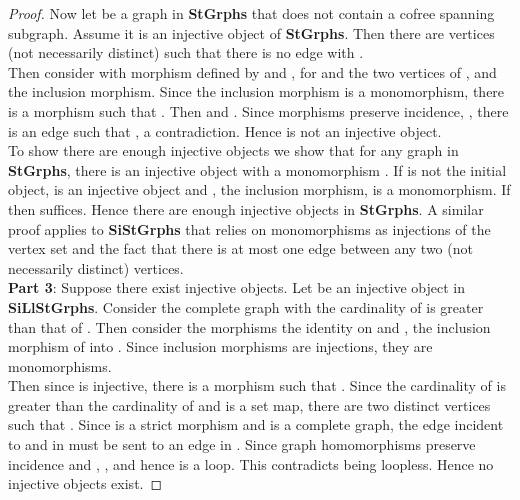\documentclass[11pt]{article}
\begin{document}
\begin{proof}
\indent Now let  be a graph in \textbf{StGrphs} that does not contain a cofree spanning subgraph. Assume it is an injective object of \textbf{StGrphs}. Then there are vertices  (not necessarily distinct) such that there is no edge  with \textunderscore.\\
\indent Then consider  with morphism  defined by  and , for  and  the two vertices of , and  the inclusion morphism. Since the inclusion morphism is a monomorphism, there is a morphism  such that . Then  and . Since morphisms preserve incidence, \textunderscore\textunderscore, there is an edge  such that \textunderscore, a contradiction. Hence  is not an injective object.\\
\indent To show there are enough injective objects we show that for any graph  in \textbf{StGrphs}, there is an injective object  with a monomorphism . If  is not the initial object,  is an injective object and , the inclusion morphism, is a monomorphism. If  then  suffices. Hence there are enough injective objects in \textbf{StGrphs}. A similar proof applies to \textbf{SiStGrphs} that relies on monomorphisms as injections of the vertex set and the fact that there is at most one edge between any two (not necessarily distinct) vertices.\\
\indent \textbf{Part 3}: Suppose there exist injective objects. Let  be an injective object in \textbf{SiLlStGrphs}. Consider the complete graph  with the cardinality of  is greater than that of . Then consider the morphisms  the identity on  and , the inclusion morphism of  into . Since inclusion morphisms are injections, they are monomorphisms.\\
\indent Then since  is injective, there is a morphism  such that . Since the cardinality of  is greater than the cardinality of  and  is a set map, there are two distinct vertices  such that . Since  is a strict morphism and  is a complete graph, the edge  incident to  and  in  must be sent to an edge in . Since graph homomorphisms preserve incidence and , \textunderscore, and hence  is a loop. This contradicts  being loopless. Hence no injective objects exist.
\end{proof}
\end{document}
